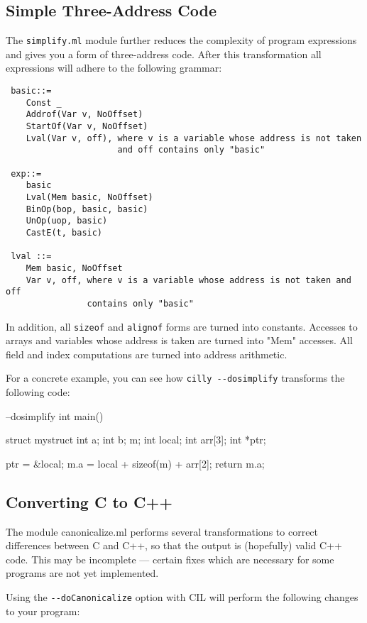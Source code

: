 \documentclass[letterpaper]{article}
\def\t#1{{\tt #1}}
\begin{document}
\subsection{Simple Three-Address Code} 

The \t{simplify.ml} module further reduces the complexity of program
expressions and gives you a form of three-address code. After this
transformation all expressions will adhere to the following grammar: 
\begin{verbatim}
 basic::=
    Const _ 
    Addrof(Var v, NoOffset)
    StartOf(Var v, NoOffset)
    Lval(Var v, off), where v is a variable whose address is not taken
                      and off contains only "basic"

 exp::=
    basic
    Lval(Mem basic, NoOffset)
    BinOp(bop, basic, basic)
    UnOp(uop, basic)
    CastE(t, basic)
   
 lval ::= 
    Mem basic, NoOffset
    Var v, off, where v is a variable whose address is not taken and off
                contains only "basic"
\end{verbatim}
In addition, all \t{sizeof} and \t{alignof} forms are turned into
constants. Accesses to arrays and variables whose address is taken are
turned into "Mem" accesses. All field and index computations are turned
into address arithmetic.

For a concrete example, you can see how \t{cilly -{}-dosimplify} 
transforms the following code:

\begin{cilcode}[global] --dosimplify
  int main() {
    struct mystruct {
      int a;
      int b;
    } m;
    int local;
    int arr[3];
    int *ptr;

    ptr = &local;
    m.a = local + sizeof(m) + arr[2];
    return m.a; 
  } 
\end{cilcode}

\subsection{Converting C to C++}

The module canonicalize.ml performs several transformations to correct
differences between C and C++, so that the output is (hopefully) valid
C++ code.  This may be incomplete --- certain fixes which are necessary
for some programs are not yet implemented.

Using the \t{-{}-doCanonicalize} option with CIL will perform the
following changes to your program:
\end{document}
